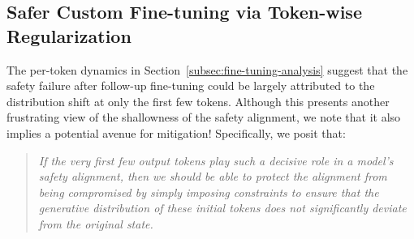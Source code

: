 






















\subsection{Safer Custom Fine-tuning via Token-wise Regularization}
\label{subsec:fine-tuning-regularization}

The per-token dynamics in Section~\ref{subsec:fine-tuning-analysis} suggest that the safety failure after follow-up fine-tuning could be largely attributed to the distribution shift at only the first few tokens. Although this presents another frustrating view of the shallowness of the safety alignment, we note that it also implies a potential avenue for mitigation! Specifically, we posit that:
\begin{quote}
\textit{If the very first few output tokens play such a 
decisive role in a model's safety alignment, then we should be able to protect the alignment from being compromised by simply imposing constraints to ensure that the generative distribution of these initial tokens does not significantly deviate from the original state.}
\end{quote}



